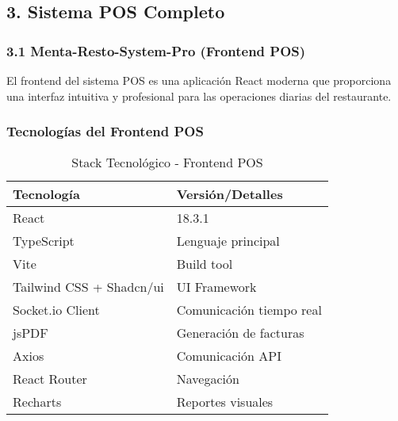 \documentclass[12pt,a4paper]{article}
\begin{document}
\subsection{3. Sistema POS Completo}

\subsubsection{3.1 Menta-Resto-System-Pro (Frontend POS)}

El frontend del sistema POS es una aplicación React moderna que proporciona una interfaz intuitiva y profesional para las operaciones diarias del restaurante.

\subsubsection{Tecnologías del Frontend POS}
\begin{table}[H]
\centering
\begin{tabular}{@{}ll@{}}
\toprule
\textbf{Tecnología} & \textbf{Versión/Detalles} \\
\midrule
React & 18.3.1 \\
TypeScript & Lenguaje principal \\
Vite & Build tool \\
Tailwind CSS + Shadcn/ui & UI Framework \\
Socket.io Client & Comunicación tiempo real \\
jsPDF & Generación de facturas \\
Axios & Comunicación API \\
React Router & Navegación \\
Recharts & Reportes visuales \\
\bottomrule
\end{tabular}
\caption{Stack Tecnológico - Frontend POS}
\end{table}
\end{document}
